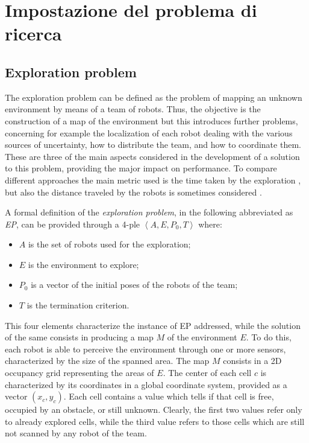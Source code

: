 \chapter{Impostazione del problema di ricerca}
\label{capitolo3}
\thispagestyle{empty}

\section{Exploration problem}

The exploration problem can be defined as the problem of mapping an
unknown environment by means of a team of robots. Thus, the objective
is the construction of a map of the environment but this introduces
further problems, concerning for example the localization of each
robot dealing with the various sources of uncertainty, how to distribute
the team, and how to coordinate them. These are three of the main
aspects considered in the development of a solution to this problem,
providing the major impact on performance. To compare different approaches
the main metric used is the time taken by the exploration \cite{Burgard2005,Rogers2013,Cattaneo2017},
but also the distance traveled by the robots is sometimes considered
\cite{Amigoni2008}.

A formal definition of the \emph{exploration problem}, in the following
abbreviated as \emph{EP},\emph{ }can be provided through a 4-ple $\left\langle A,E,P_{0},T\right\rangle $
where: 
\begin{itemize}
\item $A$ is the set of robots used for the exploration;
\item $E$ is the environment to explore;
\item $P_{0}$ is a vector of the initial poses of the robots of the team;
\item $T$ is the termination criterion.
\end{itemize}
This four elements characterize the instance of EP addressed, while
the solution of the same consists in producing a map $M$ of the environment
$E$. To do this, each robot is able to perceive the environment through
one or more sensors, characterized by the size of the spanned area.
The map $M$ consists in a 2D occupancy grid representing the areas
of $E$. The center of each cell $c$ is characterized by its coordinates
in a global coordinate system, provided as a vector $(x_{c},y_{c})$.
Each cell contains a value which tells if that cell is free, occupied
by an obstacle, or still unknown. Clearly, the first two values refer
only to already explored cells, while the third value refers to those
cells which are still not scanned by any robot of the team. 

